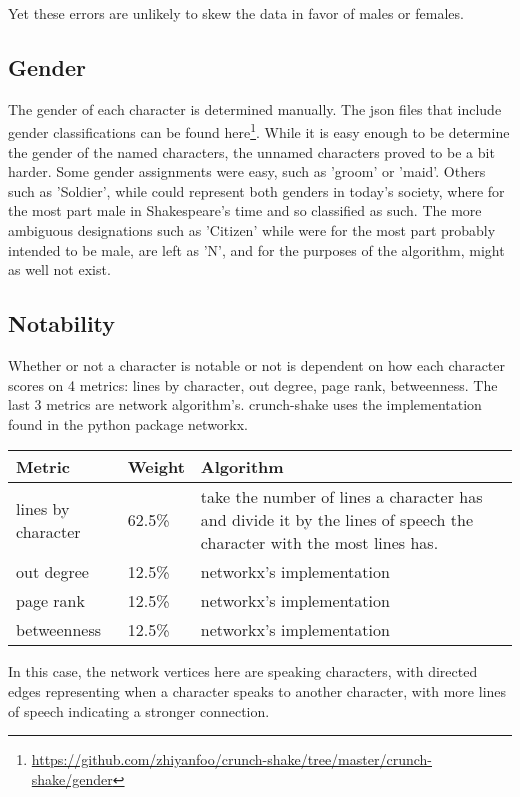 \documentclass[12pt]{article}
\begin{document}
Yet these errors are unlikely to skew the data in favor of males or females.
\subsection{Gender}
\label{sub:passing_the_criteria}

The gender of each character is determined manually. The json files that
include gender classifications can be found
here\footnote{\url{https://github.com/zhiyanfoo/crunch-shake/tree/master/crunch-shake/gender}}.
While it is easy enough to be determine the gender of the named characters, the
unnamed characters proved to be a bit harder. Some gender assignments were
easy, such as 'groom' or 'maid'. Others such as 'Soldier', while could
represent both genders in today's society, where for the most part male in
Shakespeare's time and so classified as such. The more ambiguous designations
such as 'Citizen' while were for the most part probably intended to be male,
are left as 'N', and for the purposes of the algorithm, might as well not
exist.

\subsection{Notability}
\label{sub:notability}

Whether or not a character is notable or not is dependent on how each character
scores on 4 metrics: lines by character, out degree, page rank, betweenness.
The last 3 metrics are network algorithm's. crunch-shake uses the
implementation found in the python package networkx.
\begin{center}
    \begin{tabular}{ | l | l | p{5cm} |}
    \hline
    Metric & Weight & Algorithm \\ \hline
        lines by character & 62.5\% & take the number of lines a character has
        and divide it by the lines of speech the character with
        the most lines has.\\ \hline
        out degree & 12.5\% & networkx's implementation \\ \hline
        page rank & 12.5\% & networkx's implementation \\ \hline
        betweenness & 12.5\% & networkx's implementation \\
    \hline
    \end{tabular}
\end{center}
In this case, the network vertices here are speaking characters, with directed
edges representing when a character speaks to another character, with more
lines of speech indicating a stronger connection.
\end{document}
